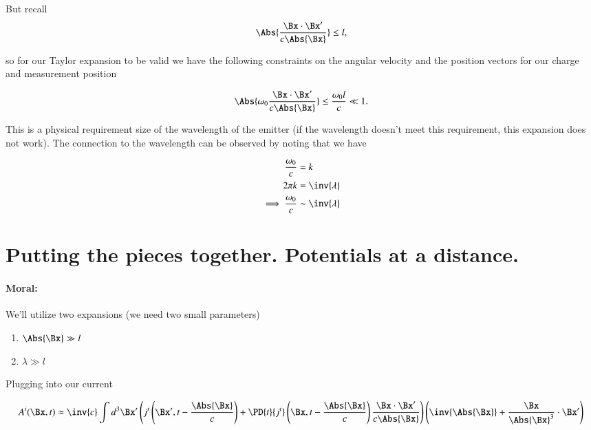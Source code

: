 But recall 
\begin{equation}\label{eqn:relativisticElectrodynamicsL20:130}
\Abs{\frac{\Bx \cdot \Bx'}{c \Abs{\Bx} }} \le l,
\end{equation}

so for our Taylor expansion to be valid we have the following constraints on the angular velocity and the position vectors for our charge and measurement position

\begin{equation}\label{eqn:relativisticElectrodynamicsL20:150}
\Abs{\omega_0 \frac{\Bx \cdot \Bx'}{c \Abs{\Bx} }} \le \frac{\omega_0 l}{c} \ll 1.
\end{equation}

This is a physical requirement size of the wavelength of the emitter (if the wavelength doesn't meet this requirement, this expansion does not work).  The connection to the wavelength can be observed by noting that we have

\begin{align*}
\frac{\omega_0}{c} &= k \\
2 \pi k &= \inv{\lambda} \\
\implies \frac{\omega_0}{c} &\sim \inv{\lambda} \\
\end{align*}

\section{Putting the pieces together.  Potentials at a distance.}

\paragraph{Moral:} We'll utilize two expansions (we need two small parameters)

\begin{enumerate}
\item $\Abs{\Bx} \gg l$
\item $\lambda \gg l$
\end{enumerate}

Plugging into our current

\begin{equation}\label{eqn:relativisticElectrodynamicsL20:190}
A^i(\Bx, t) 
\approx \inv{c} \int d^3 \Bx' 
\left( j^i\left(\Bx', t - \frac{\Abs{\Bx} }{c}\right) + \PD{t}{j^i} \left(\Bx, t - \frac{\Abs{\Bx} }{c}\right) \frac{\Bx \cdot \Bx'}{c \Abs{\Bx} } \right)
\left( \inv{\Abs{\Bx} } + \frac{\Bx}{\Abs{\Bx}^3} \cdot \Bx' \right)
\end{equation}

